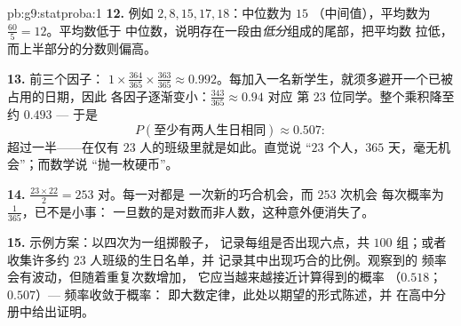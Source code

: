 \begin{solution}{pb:g9:statproba:1}
\textbf{12.} 例如 $2, 8, 15, 17, 18$：中位数为 $15$
（中间值），平均数为 $\frac{60}{5} = 12$。平均数低于
中位数，说明存在一段由\emph{低分}组成的尾部，把平均数
拉低，而上半部分的分数则偏高。

\textbf{13.} 前三个因子：
$1 \times \frac{364}{365} \times \frac{363}{365} \approx
0.992$。每加入一名新学生，就须多避开一个已被占用的日期，因此
各因子逐渐变小：$\frac{343}{365} \approx 0.94$ 对应
第 $23$ 位同学。整个乘积降至约 $0.493$ --- 于是
\[
P(\text{至少有两人生日相同}) \approx 0.507 :
\]
超过一半——在仅有 $23$ 人的班级里就是如此。直觉说
“$23$ 个人，$365$ 天，毫无机会”；而数学说
“抛一枚硬币”。

\textbf{14.} $\frac{23 \times 22}{2} = 253$ 对。每一对都是
一次新的巧合机会，而 $253$ 次机会
每次概率为 $\frac{1}{365}$，已不是小事：
一旦数的是对数而非人数，这种意外便消失了。

\textbf{15.} 示例方案：以四次为一组掷骰子，
记录每组是否出现六点，共 $100$ 组；或者
收集许多约 $23$ 人班级的生日名单，并
记录其中出现巧合的比例。观察到的
频率会有波动，但随着重复次数增加，
它应当越来越接近计算得到的概率
（$0.518$；$0.507$）--- 频率收敛于概率：
即大数定律，此处以期望的形式陈述，并
在高中分册中给出证明。
\end{solution}
